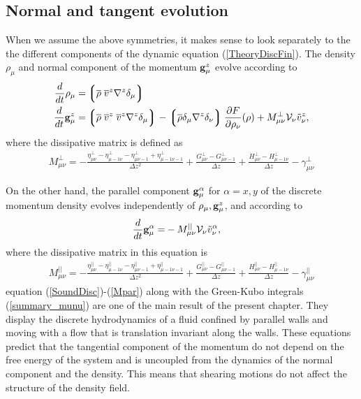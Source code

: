 \documentclass[b5paper,openright,10pt]{book}
\newcommand{\llg}{\left\lgroup}
\newcommand{\rlg}{\right\rgroup}
\begin{document}
\subsection{Normal and tangent evolution}
When we assume the above symmetries, it makes sense to look separately to the 
the different components of the dynamic equation (\ref{TheoryDiscFin}).
The density $\rho_\mu$ and normal  component of the momentum ${\bf g}^{z}_\mu$
evolve according to
\begin{align}
\frac{d}{dt}\rho_\mu=&  \llg\overline{\rho} \; \overline{v}^{z}{\nabla}^{z}\delta_\mu \rlg
\nonumber\\
    \frac{d}{dt}{{\bf g}}^{z}_\mu=&
\llg\overline{\rho}\; \overline{v}^{z}\;\overline{v}^{z}{\nabla}^{z}\delta_{\mu}\rlg
-\llg\overline{\rho}\delta_{\mu}{\nabla}^{z}\delta_{\nu}\rlg
\frac{\partial  F}{\partial \rho_{\nu}}(\rho)
+M_{\mu\nu}^{\bot}{\cal V}_\nu\tilde{v}^{z}_\nu,
\label{SoundDisc}
\end{align}
where the dissipative matrix is defined as
\begin{align}
M^{\bot}_{\mu\nu} 
=-\frac{\eta^\bot_{\mu\nu}-\eta^\bot_{\mu-1\nu}-\eta^\bot_{\mu\nu-1}+\eta^\bot_{\mu-1\nu-1}}{\Delta z^2}
+\frac{{G}^\bot_{\mu\nu}-{G}^\bot_{\mu\nu-1}}{\Delta z}
+\frac{{H}^\bot_{\mu\nu}-{H}^\bot_{\mu-1\nu}}{\Delta z}
-{\gamma}^\bot_{\mu\nu}
\label{Mbot}
\end{align}

On the other  hand, the parallel component  ${\bf g}^\alpha_\mu$ for $\alpha
=x,y$  of  the  discrete  momentum density  evolves  independently  of
$\rho_\mu,{\bf g}^{z}_\mu$, and according to
\begin{align}
    \frac{d}{dt}{{\bf g}}^\alpha_\mu=&-M_{\mu\nu}^{||}{\cal V}_\nu\tilde{v}^\alpha_\nu,
\label{ShearDisc}
\end{align}
where the dissipative matrix in this equation is
\begin{align}
M^{||}_{\mu\nu} 
=-\frac{\eta^{||}_{\mu\nu}-\eta^{||}_{\mu-1\nu}-\eta^{||}_{\mu\nu-1}+\eta^{||}_{\mu-1\nu-1}}{\Delta z^2}
+\frac{{G}^{||}_{\mu\nu}-{G}^{||}_{\mu\nu-1}}{\Delta z}
+\frac{{H}^{||}_{\mu\nu}-{H}^{||}_{\mu-1\nu}}{\Delta z}
-{\gamma}^{||}_{\mu\nu}
\label{Mpar}
\end{align}
equation (\ref{SoundDisc})-(\ref{Mpar}) along with the Green-Kubo integrals
(\ref{summary_munu})  are  one  of  the main  result  of  the  present
chapter. They display the discrete  hydrodynamics of a fluid confined by
parallel walls  and moving with  a flow that is  translation invariant
along the walls. These equations predict that the tangential component
of the momentum do not depend on  the free energy of the system and is
uncoupled  from  the   dynamics  of  the  normal   component  and  the
density.  This  means that  shearing
motions do not affect the structure of the density field.
\end{document}
